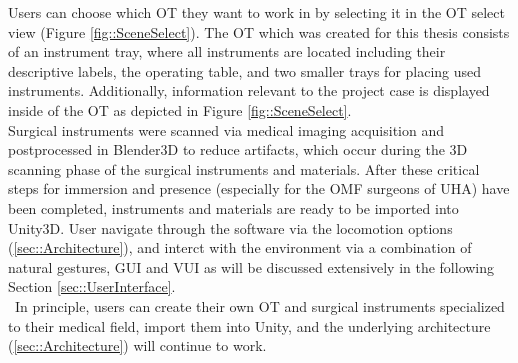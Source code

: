 Users can choose which OT they want to work in by selecting it in the OT select view (Figure \ref{fig::SceneSelect}).
The OT which was created for this thesis consists of an instrument tray, where all instruments are located including their descriptive labels, the operating table, and two smaller trays for placing used instruments.
Additionally, information relevant to the project case is displayed inside of the OT as depicted in Figure \ref{fig::SceneSelect}.
\\ Surgical instruments were scanned via medical imaging acquisition and postprocessed in Blender3D to reduce artifacts, which occur during the 3D scanning phase of the surgical instruments and materials.
After these critical steps for immersion and presence (especially for the OMF surgeons of UHA) have been completed, instruments and materials are ready to be imported into Unity3D.
User navigate through the software via the locomotion options (\ref{sec::Architecture}), and interct with the environment via a combination of natural gestures, GUI and VUI as will be discussed extensively in the following Section \ref{sec::UserInterface}.
\\ In principle, users can create their own OT and surgical instruments specialized to their medical field, import them into Unity, and the underlying architecture (\ref{sec::Architecture}) will continue to work.